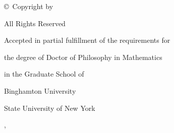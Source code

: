\newpage


\thispagestyle{empty}           %

\phantom{}

\vfill

{\centering
  \copyright\ Copyright by \legalAuthor\ \acceptanceYear\par
  All Rights Reserved\par
}

\newpage


\phantom{}

\vfill

{\centering
  Accepted in partial fulfillment of the requirements for\par
  the degree of Doctor of Philosophy in Mathematics\par
  in the Graduate School of\par
  Binghamton University\par
  State University of New York\par
  \acceptanceYear{}
  \skipTwo
  \acceptanceMonth{} \acceptanceDate{}, \acceptanceYear{}
  \skipTwo
  \committeeChair{}
  \ifthenelse{\isundefined{\committeeOne}}{}{\skipTwo\committeeOne{}}
  \ifthenelse{\isundefined{\committeeTwo}}{}{\skipTwo\committeeTwo{}}
  \ifthenelse{\isundefined{\committeeThree}}{}{\skipTwo\committeeThree{}}
  \ifthenelse{\isundefined{\committeeFour}}{}{\skipTwo\committeeFour{}}
  \ifthenelse{\isundefined{\committeeFive}}{}{\skipTwo\committeeFive{}}
  \ifthenelse{\isundefined{\committeeSix}}{}{\skipTwo\committeeSix{}}
  \ifthenelse{\isundefined{\committeeSeven}}{}{\skipTwo\committeeSeven{}}
  \ifthenelse{\isundefined{\committeeEight}}{}{\skipTwo\committeeEight{}}
  \ifthenelse{\isundefined{\committeeNine}}{}{\skipTwo\committeeNine{}}
  \ifthenelse{\isundefined{\committeeTen}}{}{\skipTwo\committeeTen{}}
  \skipTwo\committeeOutside{}\par
}


\newpage

